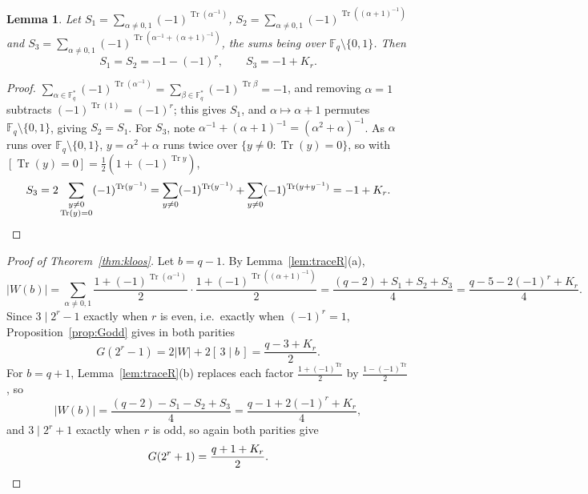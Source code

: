 \documentclass[a4paper]{article}
\newtheorem{lemma}[theorem]{Lemma}
\theoremstyle{definition}
\newcommand{\F}{\mathbb{F}}
\newcommand{\abs}[1]{\left| #1 \right|}
\newcommand{\Tr}{\operatorname{Tr}}
\begin{document}
	\begin{lemma}\label{lem:sums}
		Let $S_1 = \sum_{\alpha \ne 0,1} (-1)^{\Tr(\alpha^{-1})}$, $S_2 = \sum_{\alpha \ne 0,1} (-1)^{\Tr((\alpha+1)^{-1})}$ and $S_3 = \sum_{\alpha \ne 0,1} (-1)^{\Tr(\alpha^{-1} + (\alpha+1)^{-1})}$, the sums being over $\F_q \setminus \{0,1\}$.
		Then
		\begin{equation*}
			S_1 = S_2 = -1 - (-1)^r, \qquad S_3 = -1 + K_r .
		\end{equation*}
	\end{lemma}
	\begin{proof}
		$\sum_{\alpha \in \F_q^*}(-1)^{\Tr(\alpha^{-1})} = \sum_{\beta \in \F_q^*}(-1)^{\Tr \beta} = -1$, and removing $\alpha = 1$ subtracts $(-1)^{\Tr(1)} = (-1)^r$; this gives $S_1$, and $\alpha \mapsto \alpha + 1$ permutes $\F_q\setminus\{0,1\}$, giving $S_2 = S_1$.
		For $S_3$, note $\alpha^{-1} + (\alpha+1)^{-1} = (\alpha^2 + \alpha)^{-1}$.
		As $\alpha$ runs over $\F_q \setminus \{0,1\}$, $y = \alpha^2 + \alpha$ runs twice over $\{y \ne 0 : \Tr(y) = 0\}$, so with $[\Tr(y) = 0] = \frac{1}{2}\left(1 + (-1)^{\Tr y}\right)$,
		\begin{equation*}
			S_3 = 2 \sum_{\substack{y \ne 0 \\ \Tr(y) = 0}} (-1)^{\Tr(y^{-1})}
			= \sum_{y \ne 0}(-1)^{\Tr(y^{-1})} + \sum_{y \ne 0}(-1)^{\Tr(y + y^{-1})}
			= -1 + K_r. \qedhere
		\end{equation*}
	\end{proof}

	\begin{proof}[Proof of Theorem~\ref{thm:kloos}]
		Let $b = q-1$.
		By Lemma~\ref{lem:traceR}(a),
		\begin{equation*}
			\abs{W(b)} = \sum_{\alpha \ne 0,1} \frac{1 + (-1)^{\Tr(\alpha^{-1})}}{2}\cdot\frac{1 + (-1)^{\Tr((\alpha+1)^{-1})}}{2}
			= \frac{(q-2) + S_1 + S_2 + S_3}{4}
			= \frac{q - 5 - 2(-1)^r + K_r}{4}.
		\end{equation*}
		Since $3 \mid 2^r - 1$ exactly when $r$ is even, i.e.\ exactly when $(-1)^r = 1$, Proposition~\ref{prop:Godd} gives in both parities
		\begin{equation*}
			G(2^r - 1) = 2\abs{W} + 2[\,3\mid b\,] = \frac{q - 3 + K_r}{2}.
		\end{equation*}
		For $b = q + 1$, Lemma~\ref{lem:traceR}(b) replaces each factor $\frac{1 + (-1)^{\Tr}}{2}$ by $\frac{1 - (-1)^{\Tr}}{2}$, so
		\begin{equation*}
			\abs{W(b)} = \frac{(q-2) - S_1 - S_2 + S_3}{4} = \frac{q - 1 + 2(-1)^r + K_r}{4},
		\end{equation*}
		and $3 \mid 2^r+1$ exactly when $r$ is odd, so again both parities give
		\begin{equation*}
			G(2^r+1) = \frac{q + 1 + K_r}{2}. \qedhere
		\end{equation*}
	\end{proof}
\end{document}
